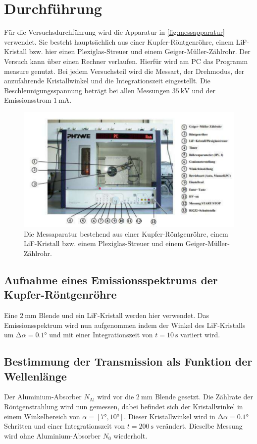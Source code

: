 \section{Durchführung}
\label{sec:Durchführung}

Für die Versuchsdurchführung wird die Apparatur in \autoref{fig:messapparatur} verwendet.
Sie besteht hauptsächlich aus einer Kupfer-Röntgenröhre, einem LiF-Kristall bzw. hier einen Plexiglas-Streuer und einem Geiger-Müller-Zählrohr.
Der Versuch kann über einen Rechner verlaufen.
Hierfür wird am PC das Programm measure genutzt.
Bei jedem Versuchsteil wird die Messart, der Drehmodus, der anzufahrende Kristallwinkel und die Integrationszeit eingestellt.
Die Beschleunigungsspannung beträgt bei allen Messungen $\SI{35}{\kilo\volt}$ und der Emissionsstrom $\SI{1}{\milli\ampere}$.

\begin{figure}
    \centering
    \includegraphics[width=\textwidth]{bilder/messaparatur.pdf}
    \caption{Die Messaparatur bestehend aus einer Kupfer-Röntgenröhre, einem LiF-Kristall bzw.
            einem Plexiglas-Streuer und einem Geiger-Müller-Zählrohr. \cite{anleitung} }
    \label{fig:messapparatur}
\end{figure}

\subsection{Aufnahme eines Emissionsspektrums der Kupfer-Röntgenröhre}
Eine $\SI{2}{\milli\metre}$ Blende und ein LiF-Kristall werden hier verwendet.
Das Emissionsspektrum wird nun aufgenommen indem der Winkel des LiF-Kristalls um $\increment \alpha = 0.1°$ und mit einer Integrationszeit von $t=\SI{10}{\second}$ variiert wird.

\subsection{Bestimmung der Transmission als Funktion der Wellenlänge}
Der Aluminium-Absorber $N_\text{Al}$ wird vor die $\SI{2}{\milli\metre}$ Blende gesetzt.
Die Zählrate der Röntgenstrahlung wird nun gemessen, dabei befindet sich der Kristallwinkel in einem Winkelbereich von $\alpha = [7°,10°]$.
Dieser Kristallwinkel wird in $\increment \alpha = 0.1°$ Schritten und einer Integrationszeit von $t = \SI{200}{\second}$ verändert.
Dieselbe Messung wird ohne Aluminium-Absorber $N_0$ wiederholt.

